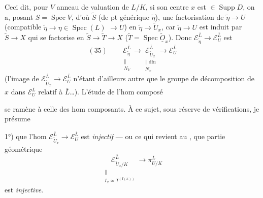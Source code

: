 \documentclass[11pt,a4paper]{article}
\begin{document}
Ceci dit, pour $V$ anneau de valuation de $L/K$, si son centre $x$  est $\in \operatorname{Supp} D$, on a,  posant $S = \operatorname{Spec} V$, d'où $\widetilde{S}$ (de pt générique $\widetilde{\eta}$), une factorisation de $\widetilde{\eta} \to U$ (compatible $\widetilde{\eta} \to \eta \in \operatorname{Spec}(L)$ $\to U$) en $\widetilde{\eta} \to \widetilde{U}_x$, car $\widetilde{\eta} \to U$ est induit par $\widetilde{S} \to X$ qui se factorise en $\widetilde{S} \to \widetilde{T} \to X$ ($\widetilde{T} = \operatorname{Spec} \widetilde{\underline{O}}_x$). Donc   $\mathcal{E}_{\widetilde{\eta}}^{\overline{L}} \to \mathcal{E}_U^{\overline{L}}$ est  
\[
  (35) \qquad
  \underset{\substack{\parallel \\ N_V}}{\mathcal{E}_{\widetilde{\eta}}^{\overline{L}}}
  \longrightarrow
  \underset{\substack{\parallel\ \text{dfn} \\ N_x}}{\mathcal{E}_{\widetilde{U}_x}^{\overline{L}}}
  \longrightarrow
  \mathcal{E}_U^{\overline{L}}
\]
(l'image de $\mathcal{E}_{\widetilde{U}_x}^{\overline{L}} \to \mathcal{E}_U^{\overline{L}}$ n'étant d'ailleurs autre que le groupe de décomposition de $x$ dans $\mathcal{E}_U^{\overline{L}}$ relatif à $\overline{L}$…). L'étude de l'hom composé

se ramène à celle des hom composants. À ce sujet, sous réserve de vérifications, je présume

1°) que l'hom $\mathcal{E}_{\widetilde{U}_x}^{\overline{L}} \to \mathcal{E}_U^{\overline{L}}$ est \emph{injectif} — ou ce qui revient au , que  partie géométrique
\[
  \underset{\substack{\parallel \\ I_x \simeq T^{(I(x))}}}{\mathcal{E}_{\widetilde{U}_x/K}^{\overline{L}}} \longrightarrow \pi_{U/K}^{\overline{L}}
\]
est \emph{injective}.

\end{document}
